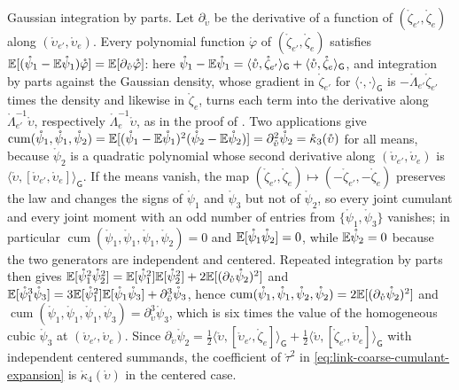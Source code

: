 Gaussian integration by parts. Let \(\partial_{\mathring\upsilon}\) be the derivative of a function of
\((\mathring\zeta_{e'},\mathring\zeta_e)\) along \((\mathring\upsilon_{e'},\mathring\upsilon_e)\). Every polynomial
function \(\mathring\varphi\) of \((\mathring\zeta_{e'},\mathring\zeta_e)\) satisfies
\(\mathbb E[(\mathring\psi_1-\mathbb E\mathring\psi_1)\mathring\varphi]=\mathbb E[\partial_{\mathring\upsilon}\mathring\varphi]\): here
\(\mathring\psi_1-\mathbb E\mathring\psi_1=\langle\mathring\upsilon,\mathring\zeta_{e'}\rangle_{\mathsf G}+\langle\mathring\upsilon,\mathring\zeta_e\rangle_{\mathsf G}\),
and integration by parts against the Gaussian density, whose gradient in \(\mathring\zeta_{e'}\) for
\(\langle\cdot,\cdot\rangle_{\mathsf G}\) is \(-\mathring\Lambda_{e'}\mathring\zeta_{e'}\) times the density and
likewise in \(\mathring\zeta_e\), turns each term into the derivative along
\(\mathring\Lambda_{e'}^{-1}\mathring\upsilon\), respectively \(\mathring\Lambda_e^{-1}\mathring\upsilon\), as in the
proof of . Two applications give
\(\operatorname{cum}(\mathring\psi_1,\mathring\psi_1,\mathring\psi_2)
=\mathbb E[(\mathring\psi_1-\mathbb E\mathring\psi_1)^2(\mathring\psi_2-\mathbb E\mathring\psi_2)]=\partial^2_{\mathring\upsilon}\mathring\psi_2
=\mathring\kappa_3(\mathring\upsilon)\) for all means, because \(\mathring\psi_2\) is a quadratic polynomial whose
second derivative along \((\mathring\upsilon_{e'},\mathring\upsilon_e)\) is
\(\langle\mathring\upsilon,[\mathring\upsilon_{e'},\mathring\upsilon_e]\rangle_{\mathsf G}\). If the means vanish, the
map \((\mathring\zeta_{e'},\mathring\zeta_e)\mapsto(-\mathring\zeta_{e'},-\mathring\zeta_e)\) preserves the law
and changes the signs of \(\mathring\psi_1\) and \(\mathring\psi_3\) but not of \(\mathring\psi_2\), so every
joint cumulant and every joint moment with an odd number of entries from
\(\{\mathring\psi_1,\mathring\psi_3\}\) vanishes; in particular
\(\operatorname{cum}(\mathring\psi_1,\mathring\psi_1,\mathring\psi_1,\mathring\psi_2)=0\) and
\(\mathbb E[\mathring\psi_1\mathring\psi_2]=0\), while \(\mathbb E\mathring\psi_2=0\) because the two generators are
independent and centered. Repeated integration by parts then gives
\(\mathbb E[\mathring\psi_1^2\mathring\psi_2^2]=\mathbb E[\mathring\psi_1^2]\mathbb E[\mathring\psi_2^2]+2\mathbb E[(\partial_{\mathring\upsilon}\mathring\psi_2)^2]\)
and
\(\mathbb E[\mathring\psi_1^3\mathring\psi_3]=3\mathbb E[\mathring\psi_1^2]\mathbb E[\mathring\psi_1\mathring\psi_3]+\partial^3_{\mathring\upsilon}\mathring\psi_3\),
hence
\(\operatorname{cum}(\mathring\psi_1,\mathring\psi_1,\mathring\psi_2,\mathring\psi_2)=2\mathbb E[(\partial_{\mathring\upsilon}\mathring\psi_2)^2]\)
and \(\operatorname{cum}(\mathring\psi_1,\mathring\psi_1,\mathring\psi_1,\mathring\psi_3)=\partial^3_{\mathring\upsilon}\mathring\psi_3\),
which is six times the value of the homogeneous cubic \(\mathring\psi_3\) at
\((\mathring\upsilon_{e'},\mathring\upsilon_e)\). Since
\(\partial_{\mathring\upsilon}\mathring\psi_2=\frac12\langle\mathring\upsilon,[\mathring\upsilon_{e'},\mathring\zeta_e]\rangle_{\mathsf G}
+\frac12\langle\mathring\upsilon,[\mathring\zeta_{e'},\mathring\upsilon_e]\rangle_{\mathsf G}\) with independent
centered summands, the coefficient of \(\mathring\tau^2\) in \eqref{eq:link-coarse-cumulant-expansion} is
\(\mathring\kappa_4(\mathring\upsilon)\) in the centered case.

